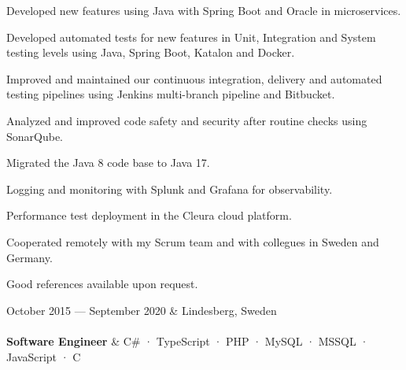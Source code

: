 \documentclass{cv-stylish}
\begin{document}
\begin{center}
\begin{InfoBody}
\begin{compactitem}
  \item Developed new features using Java with Spring Boot and Oracle in
    microservices.
  \item Developed automated tests for new features in Unit, Integration and
    System testing levels using Java, Spring Boot, Katalon and Docker.
  \item Improved and maintained our continuous integration, delivery
    and automated testing pipelines using Jenkins multi-branch
    pipeline and Bitbucket.
  \item Analyzed and improved code safety and security after routine
    checks using SonarQube.
  \item Migrated the Java 8 code base to Java 17.
  \item Logging and monitoring with Splunk and Grafana for observability.
  \item Performance test deployment in the Cleura cloud platform.
  \item Cooperated remotely with my Scrum team and with collegues in
    Sweden and Germany.
\end{compactitem}
Good references available upon request.
\end{InfoBody}

\vspace{1em}
\begin{JobTable}
  October 2015 --- September 2020 & \hfill Lindesberg, Sweden \\[3pt]
   \\[3pt]
  \hspace{5mm} \textbf{Software Engineer}
  & \hfill C\# · TypeScript · PHP · MySQL · MSSQL · JavaScript · C \\
\end{JobTable}
\begin{InfoBody}


\end{InfoBody}
\end{center}
\end{document}
